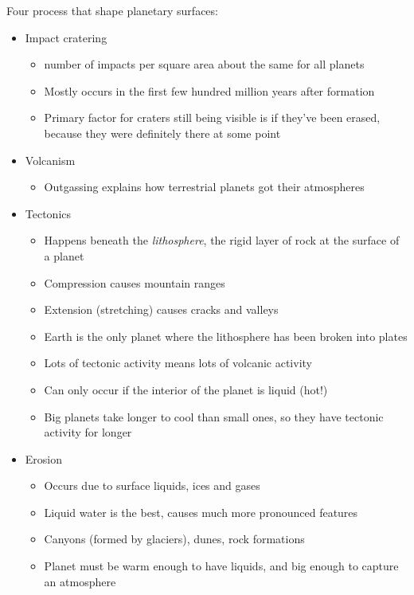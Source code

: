 \documentclass[12pt]{article}
\begin{document}
Four process that shape planetary surfaces:
\begin{itemize}
    \item Impact cratering
    \begin{itemize}
        \item number of impacts per square area about the same for all planets
        \item Mostly occurs in the first few hundred million years after formation
        \item Primary factor for craters still being visible is if they've been erased, because they were definitely there at some point

    \end{itemize}
    \item Volcanism
    \begin{itemize}
        \item Outgassing explains how terrestrial planets got their atmospheres
    \end{itemize}
    \item Tectonics
    \begin{itemize}
        \item Happens beneath the \emph{lithosphere}, the rigid layer of rock at the surface of a planet
        \item Compression causes mountain ranges
        \item Extension (stretching) causes cracks and valleys
        \item Earth is the only planet where the lithosphere has been broken into plates
        \item Lots of tectonic activity means lots of volcanic activity
        \item Can only occur if the interior of the planet is liquid (hot!)
        \item Big planets take longer to cool than small ones, so they have tectonic activity for longer
    \end{itemize}
    \item Erosion
    \begin{itemize}
        \item Occurs due to surface liquids, ices and gases
        \item Liquid water is the best, causes much more pronounced features
        \item Canyons (formed by glaciers), dunes, rock formations
        \item Planet must be warm enough to have liquids, and big enough to capture an atmosphere
    \end{itemize}
\end{itemize}
\end{document}
